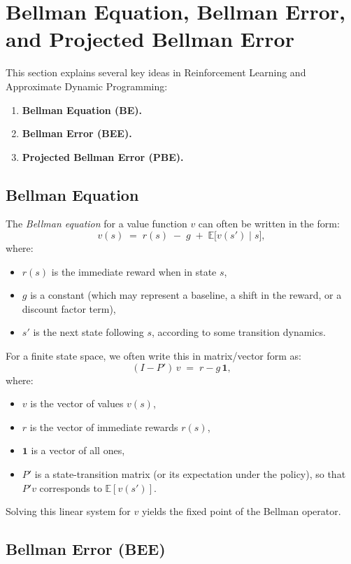 \section{Bellman Equation, Bellman Error, and Projected Bellman Error}
\label{sec:bellman_error}

This section explains several key ideas in Reinforcement Learning and Approximate Dynamic Programming:

\begin{enumerate}
    \item \textbf{Bellman Equation (BE).}
    \item \textbf{Bellman Error (BEE).}
    \item \textbf{Projected Bellman Error (PBE).}
\end{enumerate}

\subsection{Bellman Equation}
\label{subsec:bellman_equation}

The \emph{Bellman equation} for a value function $v$ can often be written in the form:
\[
v(s) \;=\; r(s) \;-\; g \;+\; \mathbb{E}\bigl[v(s') \mid s\bigr],
\]
where:
\begin{itemize}
    \item $r(s)$ is the immediate reward when in state $s$,
    \item $g$ is a constant (which may represent a baseline, a shift in the reward, or a discount factor term),
    \item $s'$ is the next state following $s$, according to some transition dynamics.
\end{itemize}
For a finite state space, we often write this in matrix/vector form as:
\[
(I - P')\,v \;=\; r - g\,\mathbf{1},
\]
where:
\begin{itemize}
    \item $v$ is the vector of values $v(s)$,
    \item $r$ is the vector of immediate rewards $r(s)$,
    \item $\mathbf{1}$ is a vector of all ones,
    \item $P'$ is a state-transition matrix (or its expectation under the policy), so that $P'v$ corresponds to $\mathbb{E}[v(s')]$.
\end{itemize}
Solving this linear system for $v$ yields the fixed point of the Bellman operator.

\subsection{Bellman Error (BEE)}
\label{subsec:bellman_error_measure}

